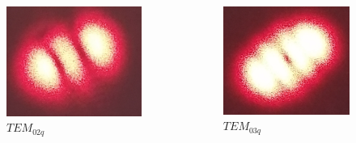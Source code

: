 \documentclass{beamer}
\begin{document}
\begin{frame}
		\vspace{-10pt}
		
		\begin{columns}
			\begin{column}{0.3\textwidth}
				\begin{figure}
					\centering
					\includegraphics[width=1\linewidth]{res/tem02.png}
					\vspace{-10pt}
					\caption{\footnotesize  $TEM_{02q}$}
				\end{figure}
			\end{column}
			\begin{column}{0.3\textwidth}
				\begin{figure}
					\centering
					\includegraphics[width=1\linewidth]{res/tem03.png}
					\vspace{-10pt}
					\caption{\footnotesize $TEM_{03q}$}
				\end{figure}
			\end{column}
		\end{columns}	
	\end{frame}
	
\end{document}
